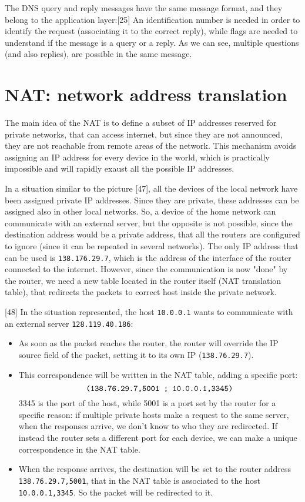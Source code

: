 \noindent The DNS query and reply messages have the same message format, and they belong to the application layer:[25]
An identification number is needed in order to identify the request (associating it to the correct reply), while flags are needed to understand if the message is a query or a reply. As we can see, multiple questions (and also replies), are possible in the same message.

\section{NAT: network address translation}
The main idea of the NAT is to define a subset of IP addresses reserved for private networks, that can access internet, but since they are not announced, they are not reachable from remote areas of the network. This mechanism avoids assigning an IP address for every device in the world, which is practically impossible and will rapidly exaust all the possible IP addresses.

In a situation similar to the picture [47], all the devices of the local network have been assigned private IP addresses. Since they are private, these addresses can be assigned also in other local networks. So, a device of the home network can communicate with an external server, but the opposite is not possible, since the destination address would be a private address, that all the routers are configured to ignore (since it can be repeated in several networks). The only IP address that can be used is \texttt{138.176.29.7}, which is the address of the interface of the router connected to the internet. However, since the communication is now "done" by the router, we need a new table located in the router itself (NAT translation table), that redirects the packets to correct host inside the private network.

[48] In the situation represented, the host \texttt{10.0.0.1} wants to communicate with an external server \texttt{128.119.40.186}:
\begin{itemize}
    \item As soon as the packet reaches the router, the router will override the IP source field of the packet, setting it to its own IP (\texttt{138.76.29.7}).
    \item This correspondence will be written in the NAT table, adding a specific port:
    \[\texttt{(138.76.29.7,\textbf{5001} ; 10.0.0.1,3345)}\]
    3345 is the port of the host, while 5001 is a port set by the router for a specific reason: if multiple private hosts make a request to the same server, when the responses arrive, we don't know to who they are redirected. If instead the router sets a different port for each device, we can make a unique correspondence in the NAT table.
    \item When the response arrives, the destination will be set to the router address \texttt{138.76.29.7,5001}, that in the NAT table is associated to the host \texttt{10.0.0.1,3345}. So the packet will be redirected to it.
\end{itemize}

